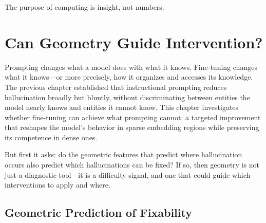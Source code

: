 \begin{savequote}[75mm]
The purpose of computing is insight, not numbers.
\end{savequote}

\chapter{Can Geometry Guide Intervention?}
\label{ch:finetuning}



Prompting changes what a model does with what it knows. Fine-tuning changes what it knows---or more precisely, how it organizes and accesses its knowledge. The previous chapter established that instructional prompting reduces hallucination broadly but bluntly, without discriminating between entities the model nearly knows and entities it cannot know. This chapter investigates whether fine-tuning can achieve what prompting cannot: a targeted improvement that reshapes the model's behavior in sparse embedding regions while preserving its competence in dense ones.

But first it asks: do the geometric features that predict where hallucination occurs also predict which hallucinations can be fixed? If so, then geometry is not just a diagnostic tool---it is a difficulty signal, and one that could guide which interventions to apply and where.

\section{Geometric Prediction of Fixability}
\label{sec:fixability-prediction}

